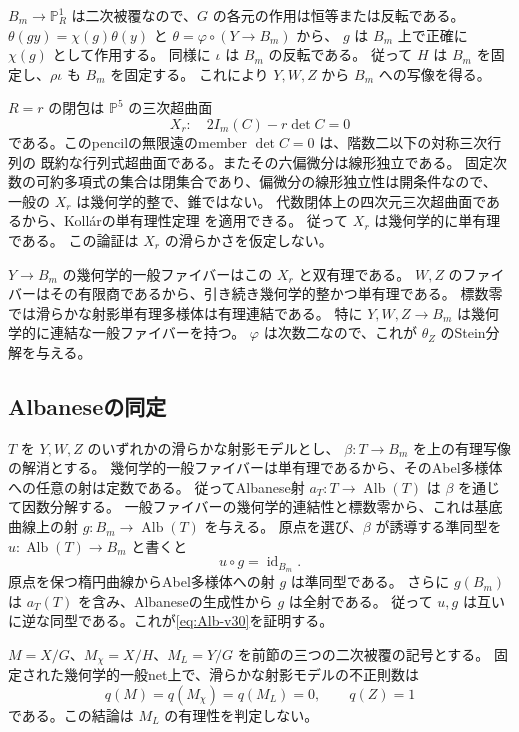 $B_m\to\mathbb P^1_R$ は二次被覆なので、$G$ の各元の作用は恒等または反転である。
$\theta(gy)=\chi(g)\theta(y)$ と $\theta=\varphi\circ(Y\to B_m)$ から、
$g$ は $B_m$ 上で正確に $\chi(g)$ として作用する。
同様に $\iota$ は $B_m$ の反転である。
従って $H$ は $B_m$ を固定し、$\rho\iota$ も $B_m$ を固定する。
これにより $Y,W,Z$ から $B_m$ への写像を得る。

$R=r$ の閉包は $\mathbb P^5$ の三次超曲面
\begin{equation}\label{eq:cubic-fiber-v30}
 X_r:\quad 2I_m(C)-r\det C=0
\end{equation}
である。このpencilの無限遠のmember $\det C=0$ は、階数二以下の対称三次行列の
既約な行列式超曲面である。またその六偏微分は線形独立である。
固定次数の可約多項式の集合は閉集合であり、偏微分の線形独立性は開条件なので、
一般の $X_r$ は幾何学的整で、錐ではない。
代数閉体上の四次元三次超曲面であるから、Koll\'arの単有理性定理
\cite[Theorem 2]{KollarCubicUnirational}を適用できる。
従って $X_r$ は幾何学的に単有理である。
この論証は $X_r$ の滑らかさを仮定しない。

$Y\to B_m$ の幾何学的一般ファイバーはこの $X_r$ と双有理である。
$W,Z$ のファイバーはその有限商であるから、引き続き幾何学的整かつ単有理である。
標数零では滑らかな射影単有理多様体は有理連結である。
特に $Y,W,Z\to B_m$ は幾何学的に連結な一般ファイバーを持つ。
$\varphi$ は次数二なので、これが $\theta_Z$ のStein分解を与える。

\subsection{Albaneseの同定}

$T$ を $Y,W,Z$ のいずれかの滑らかな射影モデルとし、
$\beta:T\to B_m$ を上の有理写像の解消とする。
幾何学的一般ファイバーは単有理であるから、そのAbel多様体への任意の射は定数である。
従ってAlbanese射 $a_T:T\to\operatorname{Alb}(T)$ は $\beta$ を通じて因数分解する。
一般ファイバーの幾何学的連結性と標数零から、これは基底曲線上の射
$g:B_m\to\operatorname{Alb}(T)$ を与える。
原点を選び、$\beta$ が誘導する準同型を $u:\operatorname{Alb}(T)\to B_m$ と書くと
\[
 u\circ g=\operatorname{id}_{B_m}.
\]
原点を保つ楕円曲線からAbel多様体への射 $g$ は準同型である。
さらに $g(B_m)$ は $a_T(T)$ を含み、Albaneseの生成性から $g$ は全射である。
従って $u,g$ は互いに逆な同型である。これが\eqref{eq:Alb-v30}を証明する。


\begin{corollary}[三つの二次被覆の不正則数の区別]
\label{cor:three-cover-q-v30}
$M=X/G$、$M_\chi=X/H$、$M_L=Y/G$ を前節の三つの二次被覆の記号とする。
固定された幾何学的一般net上で、滑らかな射影モデルの不正則数は
\[
 q(M)=q(M_\chi)=q(M_L)=0,\qquad q(Z)=1
\]
である。この結論は $M_L$ の有理性を判定しない。
\end{corollary}

